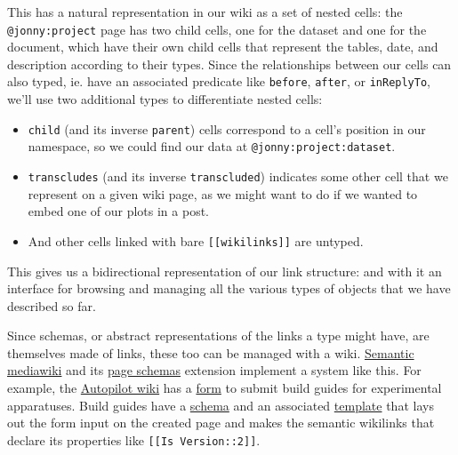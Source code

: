 This has a natural representation in our wiki as a set of nested cells:
the \texttt{@jonny:project} page has two child cells, one for the
dataset and one for the document, which have their own child cells that
represent the tables, date, and description according to their types.
Since the relationships between our cells can also typed, ie. have an
associated predicate like \texttt{before}, \texttt{after}, or
\texttt{inReplyTo}, we'll use two additional types to differentiate
nested cells:

\begin{itemize}

\item
  \texttt{child} (and its inverse \texttt{parent}) cells correspond to a
  cell's position in our namespace, so we could find our data at
  \texttt{@jonny:project:dataset}.
\item
  \texttt{transcludes} (and its inverse \texttt{transcluded}) indicates
  some other cell that we represent on a given wiki page, as we might
  want to do if we wanted to embed one of our plots in a post.
\item
  And other cells linked with bare \texttt{{[}{[}wikilinks{]}{]}} are
  untyped.
\end{itemize}

This gives us a bidirectional representation of our link structure: and
with it an interface for browsing and managing all the various types of
objects that we have described so far.

Since schemas, or abstract representations of the links a type might
have, are themselves made of links, these too can be managed with a
wiki.
\href{https://www.semantic-mediawiki.org/wiki/Semantic_MediaWiki}{Semantic
mediawiki} and its
\href{https://www.mediawiki.org/wiki/Extension:Page_Schemas}{page
schemas} extension implement a system like this. For example, the
\href{https://wiki.auto-pi-lot.com}{Autopilot wiki} has a
\href{https://wiki.auto-pi-lot.com/index.php/Form:Build_Guide}{form} to
submit build guides for experimental apparatuses. Build guides have a
\href{https://wiki.auto-pi-lot.com/index.php/Category:Construction_Build_Guide}{schema}
and an associated
\href{https://wiki.auto-pi-lot.com/index.php/Template:Build_Guide}{template}
that lays out the form input on the created page and makes the semantic
wikilinks that declare its properties like
\texttt{{[}{[}Is\ Version::2{]}{]}}.

